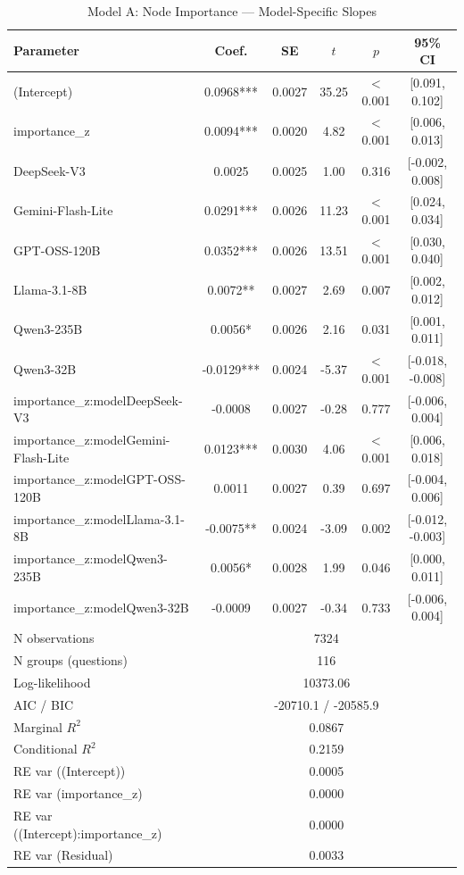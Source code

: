 \begin{table}[htbp]
\centering
\small
\caption{Model A: Node Importance --- Model-Specific Slopes}
\label{tab:lme_model_a_table}
\begin{tabular}{lccccc}
\toprule
Parameter & Coef. & SE & $t$ & $p$ & 95\% CI \\
\midrule
  (Intercept) & 0.0968*** & 0.0027 & 35.25 & $<$0.001 & [0.091, 0.102] \\
  importance\_z & 0.0094*** & 0.0020 & 4.82 & $<$0.001 & [0.006, 0.013] \\
  DeepSeek-V3 & 0.0025 & 0.0025 & 1.00 & 0.316 & [-0.002, 0.008] \\
  Gemini-Flash-Lite & 0.0291*** & 0.0026 & 11.23 & $<$0.001 & [0.024, 0.034] \\
  GPT-OSS-120B & 0.0352*** & 0.0026 & 13.51 & $<$0.001 & [0.030, 0.040] \\
  Llama-3.1-8B & 0.0072** & 0.0027 & 2.69 & 0.007 & [0.002, 0.012] \\
  Qwen3-235B & 0.0056* & 0.0026 & 2.16 & 0.031 & [0.001, 0.011] \\
  Qwen3-32B & -0.0129*** & 0.0024 & -5.37 & $<$0.001 & [-0.018, -0.008] \\
  importance\_z:modelDeepSeek-V3 & -0.0008 & 0.0027 & -0.28 & 0.777 & [-0.006, 0.004] \\
  importance\_z:modelGemini-Flash-Lite & 0.0123*** & 0.0030 & 4.06 & $<$0.001 & [0.006, 0.018] \\
  importance\_z:modelGPT-OSS-120B & 0.0011 & 0.0027 & 0.39 & 0.697 & [-0.004, 0.006] \\
  importance\_z:modelLlama-3.1-8B & -0.0075** & 0.0024 & -3.09 & 0.002 & [-0.012, -0.003] \\
  importance\_z:modelQwen3-235B & 0.0056* & 0.0028 & 1.99 & 0.046 & [0.000, 0.011] \\
  importance\_z:modelQwen3-32B & -0.0009 & 0.0027 & -0.34 & 0.733 & [-0.006, 0.004] \\
\midrule
  N observations & \multicolumn{5}{c}{7324} \\
  N groups (questions) & \multicolumn{5}{c}{116} \\
  Log-likelihood & \multicolumn{5}{c}{10373.06} \\
  AIC / BIC & \multicolumn{5}{c}{-20710.1 / -20585.9} \\
  Marginal $R^2$ & \multicolumn{5}{c}{0.0867} \\
  Conditional $R^2$ & \multicolumn{5}{c}{0.2159} \\
  RE var ((Intercept)) & \multicolumn{5}{c}{0.0005} \\
  RE var (importance\_z) & \multicolumn{5}{c}{0.0000} \\
  RE var ((Intercept):importance\_z) & \multicolumn{5}{c}{0.0000} \\
  RE var (Residual) & \multicolumn{5}{c}{0.0033} \\
\bottomrule
\end{tabular}
\end{table}
